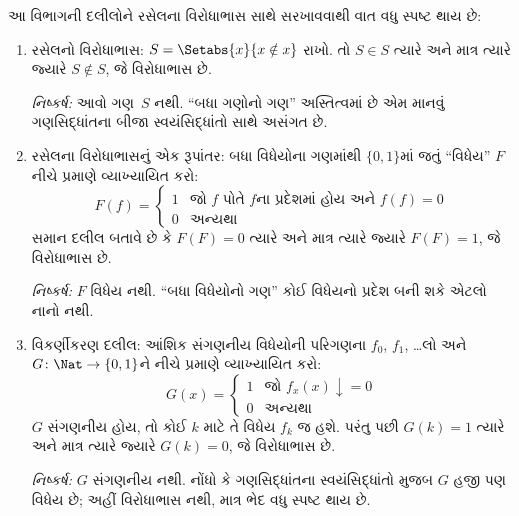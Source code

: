 \documentclass[../../../include/open-logic-section]{subfiles}
\begin{document}

આ વિભાગની દલીલોને રસેલના વિરોધાભાસ સાથે સરખાવવાથી વાત વધુ
સ્પષ્ટ થાય છે:
\begin{enumerate}
\item રસેલનો વિરોધાભાસ: $S = \Setabs{x}{x \notin x}$ રાખો. તો
  $S \in S$ ત્યારે અને માત્ર ત્યારે જ્યારે $S \notin S$,
  જે વિરોધાભાસ છે.

  \emph{નિષ્કર્ષ:} આવો ગણ~$S$ નથી. ``બધા ગણોનો ગણ'' અસ્તિત્વમાં
  છે એમ માનવું ગણસિદ્ધાંતના બીજા સ્વયંસિદ્ધાંતો સાથે અસંગત છે.

\item રસેલના વિરોધાભાસનું એક રૂપાંતર: બધા વિધેયોના ગણમાંથી
  $\{ 0, 1 \}$માં જતું ``વિધેય'' $F$ નીચે પ્રમાણે વ્યાખ્યાયિત કરો:
  \[
  F(f) =
  \begin{cases}
    1 & \text{જો $f$ પોતે $f$ના પ્રદેશમાં હોય અને $f(f) = 0$} \\
    0 & \text{અન્યથા}
  \end{cases}
  \]
  સમાન દલીલ બતાવે છે કે $F(F) = 0$ ત્યારે અને માત્ર ત્યારે જ્યારે
  $F(F) = 1$, જે વિરોધાભાસ છે.

  \emph{નિષ્કર્ષ:} $F$ વિધેય નથી. ``બધા વિધેયોનો ગણ'' કોઈ વિધેયનો
  પ્રદેશ બની શકે એટલો નાનો નથી.

\item વિકર્ણીકરણ દલીલ: આંશિક સંગણનીય વિધેયોની પરિગણના
  $f_0$, $f_1$, \dots લો અને $G \colon \Nat \to
  \{ 0, 1 \}$ને નીચે પ્રમાણે વ્યાખ્યાયિત કરો:
  \[
  G(x) =
  \begin{cases}
    1 & \text{જો $f_x(x)\downarrow = 0$} \\
    0 & \text{અન્યથા}
  \end{cases}
  \]
  $G$ સંગણનીય હોય, તો કોઈ $k$ માટે તે વિધેય $f_k$ જ હશે.
  પરંતુ પછી $G(k) = 1$ ત્યારે અને માત્ર ત્યારે જ્યારે $G(k) = 0$,
  જે વિરોધાભાસ છે.

  \emph{નિષ્કર્ષ:} $G$ સંગણનીય નથી. નોંધો કે ગણસિદ્ધાંતના
  સ્વયંસિદ્ધાંતો મુજબ $G$ હજી પણ વિધેય છે; અહીં વિરોધાભાસ
  નથી, માત્ર ભેદ વધુ સ્પષ્ટ થાય છે.
\end{enumerate}
\end{document}
